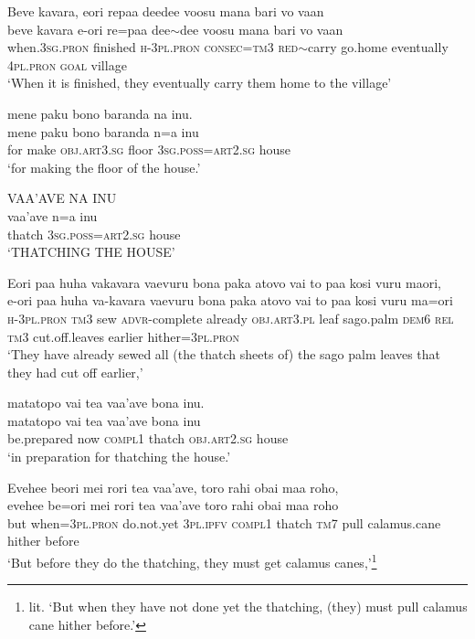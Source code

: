 \ea\label{ex:text2-27}
Beve kavara, eori repaa deedee voosu mana bari vo vaan\\
\gll beve	kavara	e-ori	re=paa	dee{$\sim$}dee	voosu	mana	bari	vo	vaan\\
     when.3\textsc{sg}.\textsc{pron}	finished	\textsc{h}-3\textsc{pl}.\textsc{pron}	\textsc{consec}=\textsc{tm}3	\textsc{red}{$\sim$}carry	go.home	eventually	4\textsc{pl}.\textsc{pron}	\textsc{goal}	village\\
\glt `When it is finished, they eventually carry them home to the village'
\z

\ea\label{ex:text2-28}
mene paku bono baranda na inu.\\
\gll mene	paku	bono	baranda	n=a	inu\\
     for	make	\textsc{obj}.\textsc{art}3.\textsc{sg}	floor	3\textsc{sg}.\textsc{poss}=\textsc{art}2.\textsc{sg}	house\\
\glt `for making the floor of the house.'
\z

\ea\label{ex:text2-29}
VAA'AVE NA INU\\
\gll vaa'ave	n=a	inu\\
     thatch	3\textsc{sg}.\textsc{poss}=\textsc{art}2.\textsc{sg}	house\\
\glt `THATCHING THE HOUSE'
\z

\ea\label{ex:text2-30}
Eori paa huha vakavara vaevuru bona paka atovo vai to paa kosi vuru maori,\\
\gll e-ori	paa	huha	va-kavara	vaevuru	bona	paka	atovo	vai	to	paa	kosi	vuru	ma=ori\\
     \textsc{h}-3\textsc{pl}.\textsc{pron}	\textsc{tm}3	sew	\textsc{advr}-complete	already	\textsc{obj}.\textsc{art}3.\textsc{pl}	leaf	sago.palm	\textsc{dem}6	\textsc{rel}	\textsc{tm}3	cut.off.leaves	earlier	hither=3\textsc{pl}.\textsc{pron}\\
\glt `They have already sewed all (the thatch sheets of) the sago palm leaves that they had cut off earlier,'
\z

\ea\label{ex:text2-31}
matatopo vai tea vaa'ave bona inu.\\
\gll matatopo	vai	tea	vaa'ave	bona	inu\\
     be.prepared	now	\textsc{compl}1	thatch	\textsc{obj}.\textsc{art}2.\textsc{sg}	house\\
\glt `in preparation for thatching the house.'
\z

\ea\label{ex:text2-32}
Evehee beori mei rori tea vaa'ave, toro rahi obai maa roho,\\
\gll evehee	be=ori	mei	rori	tea	vaa'ave	toro	rahi	obai	maa	roho\\
     but	when=3\textsc{pl}.\textsc{pron}	do.not.yet	3\textsc{pl}.\textsc{ipfv}	\textsc{compl}1	thatch	\textsc{tm}7	pull	calamus.cane	hither	before\\
\glt `But before they do the thatching, they must get calamus canes,'\footnote{lit. `But when they have not done yet the thatching, (they) must pull calamus cane hither before.'}
\z

